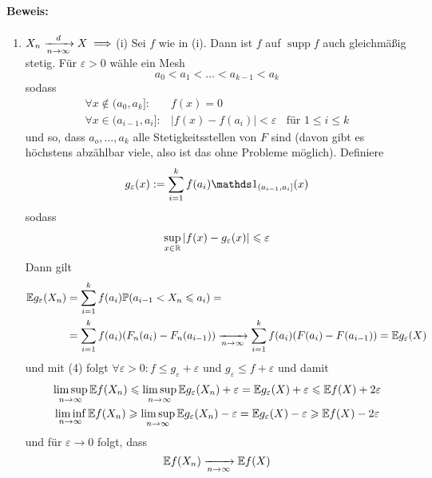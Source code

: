 \documentclass[11pt]{report}
\begin{document}
\paragraph{Beweis:}
\begin{enumerate}[label=\Roman*. ]
    \item $X_n\nto{d}{n\to\infty}X\implies$(i) \newline
    Sei $f$ wie in (i). Dann ist $f$ auf $\operatorname{supp}f$ auch gleichm\"a\ss{}ig stetig. F\"ur $\varepsilon>0$ w\"ahle ein Mesh    
        $$a_0<a_1<\hdots<a_{k-1}<a_k$$
		sodass 
    \begin{align*}
        \forall x\notin(a_0,a_k]:&f(x)=0 \\
        \forall x\in(a_{i-1},a_i]:&|f(x)-f(a_i)|<\varepsilon \ \ \ \ \text{f\"ur } 1\leq i\leq k 
	\end{align*}
    und so, dass $a_o,\hdots,a_k$ alle Stetigkeitsstellen von $F$ sind (davon
    gibt es h\"ochstens abz\"ahlbar viele, also ist das ohne Probleme m\"oglich).\newline
	Definiere
        $$g_\varepsilon(x):=\sum_{i=1}^kf(a_i)\ind{(a_{i-1},a_i]}(x)$$
	sodass 
    \begin{gather}
        \sup_{x\in\mathbb{R}}|f(x)-g_\varepsilon(x)|\leqslant\varepsilon
	\end{gather}
	Dann gilt 
    \begin{align*}
	   \E g_\varepsilon(X_n)&=\sum_{i=1}^kf(a_i)\Pp(a_{i-1}<X_n\leq a_i)= \\
        &=\sum_{i=1}^kf(a_i)(F_n(a_i)-F_n(a_{i-1}))\nto{}{n\to\infty}\sum_{i=1}^kf(a_i)(F(a_i)-F(a_{i-1}))=\E g_\varepsilon(X)
    \end{align*}
    und mit (4) folgt $\forall\varepsilon>0: f\leq g_\varepsilon+\varepsilon$ und $g_\varepsilon\leq f+\varepsilon$ und damit
	\begin{gather*}
        \limsup_{n\to\infty}\mathbb{E} f(X_n)\leqslant\limsup_{n\to\infty}\mathbb{E} g_\varepsilon(X_n)+\varepsilon=\mathbb{E} g_\varepsilon(X)+\varepsilon\leqslant\mathbb{E} f(X)+2\varepsilon \\
		\liminf_{n\to\infty}\mathbb{E} f(X_n)\geqslant\limsup_{n\to\infty}\mathbb{E} g_\varepsilon(X_n)-\varepsilon=\mathbb{E} g_\varepsilon(X)-\varepsilon\geqslant\mathbb{E} f(X)-2\varepsilon
    \end{gather*}
    und f\"ur $\varepsilon\to0$ folgt, dass 
        $$\E f(X_n)\nto{}{n\to\infty}\E f(X)$$
    

\end{enumerate}
\end{document}
